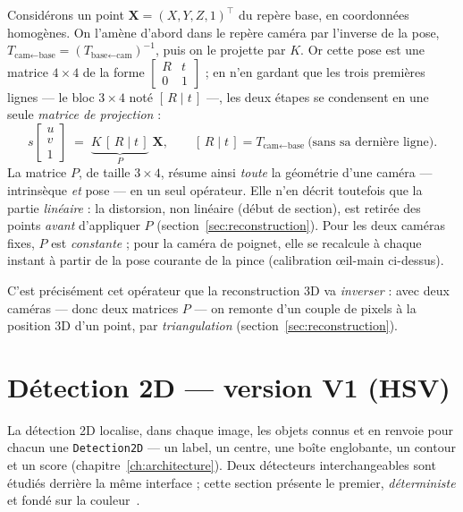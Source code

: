 Considérons un point $\mathbf{X} = (X, Y, Z, 1)^{\top}$ du repère base, en coordonnées homogènes. On l'amène d'abord dans le repère caméra par l'inverse de la pose, $T_{\text{cam}\leftarrow\text{base}} = (T_{\text{base}\leftarrow\text{cam}})^{-1}$, puis on le projette par $K$. Or cette pose est une matrice $4\times4$ de la forme $\left[\begin{smallmatrix} R & t\\ 0 & 1 \end{smallmatrix}\right]$ ; en n'en gardant que les trois premières lignes --- le bloc $3\times4$ noté $[\,R \mid t\,]$ ---, les deux étapes se condensent en une seule \emph{matrice de projection} :
\[
  s \begin{bmatrix} u \\ v \\ 1 \end{bmatrix}
  \;=\; \underbrace{K\,[\,R \mid t\,]}_{P}\; \mathbf{X},
  \qquad [\,R \mid t\,] = T_{\text{cam}\leftarrow\text{base}}\ \text{(sans sa dernière ligne)} .
\]
La matrice $P$, de taille $3\times4$, résume ainsi \emph{toute} la géométrie d'une caméra --- intrinsèque \emph{et} pose --- en un seul opérateur. Elle n'en décrit toutefois que la partie \emph{linéaire} : la distorsion, non linéaire (début de section), est retirée des points \emph{avant} d'appliquer $P$ (section~\ref{sec:reconstruction}). Pour les deux caméras fixes, $P$ est \emph{constante} ; pour la caméra de poignet, elle se recalcule à chaque instant à partir de la pose courante de la pince (calibration œil-main ci-dessus).

C'est précisément cet opérateur que la reconstruction 3D va \emph{inverser} : avec deux caméras --- donc deux matrices $P$ --- on remonte d'un couple de pixels à la position 3D d'un point, par \emph{triangulation} (section~\ref{sec:reconstruction}).

\section{Détection 2D --- version V1 (HSV)}
\label{sec:detection-v1}

La détection 2D localise, dans chaque image, les objets connus et en renvoie pour chacun une \texttt{Detection2D} --- un label, un centre, une boîte englobante, un contour et un score (chapitre~\ref{ch:architecture}). Deux détecteurs interchangeables sont étudiés derrière la même interface ; cette section présente le premier, \emph{déterministe} et fondé sur la couleur~\cite{forsyth_computer_2012}.

